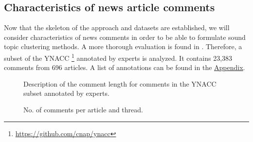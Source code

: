 \subsection{Characteristics of news article comments}
\label{review}
Now that the skeleton of the approach and datasets are established, we will consider characteristics of news comments in order to be able to formulate sound topic clustering methods. A more thorough evaluation is found in \cite{napoles2017ynacc}.
Therefore, a subset of the YNACC \footnote{\url{https://github.com/cnap/ynacc}} \cite{napoles2017ynacc} annotated by experts is analyzed. It contains 23,383 comments from 696 articles. A list of annotations can be found in the \hyperref[ynacclabel]{Appendix}.
\begin{figure}[h]%
\centering
{}%
\qquad
{}%
\caption{Description of the comment length for comments in the YNACC subset annotated by experts.}
\end{figure}
\begin{figure}[h]%
\centering
{}%
\qquad
{}%
\caption{No. of comments per article and thread.}
\end{figure}
